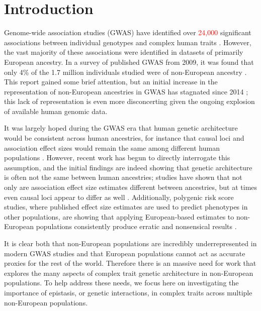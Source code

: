 \documentclass[12pt, a4paper]{article}
\begin{document}
\linenumbers

\section{Introduction}\label{InterPath-Introduction}

Genome-wide association studies (GWAS) have identified over \textcolor{red}{24,000} significant associations between individual genotypes and complex human traits \citep{Buniello2019}. However, the vast majority of these associations were identified in datasets of primarily European ancestry. In a survey of published GWAS from 2009, it was found that only 4\% of the 1.7 million individuals studied were of non-European ancestry \citep{Need2009}. This report gained some brief attention, but an initial increase in the representation of non-European ancestries in GWAS has stagnated since 2014 \citep{Popejoy2016,Martin2019}; this lack of representation is even more disconcerting given the ongoing explosion of available human genomic data. 

It was largely hoped during the GWAS era that human genetic architecture would be consistent across human ancestries, for instance that causal loci and association effect sizes would remain the same among different human populations \citep{Need2009,Pulit2010,Bustamante2011,Bien2019}. However, recent work has begun to directly interrogate this assumption, and the initial findings are indeed showing that genetic architecture is often not the same between human ancestries; studies have shown that not only are association effect size estimates different between ancestries, but at times even causal loci appear to differ as well \citep{Dumitrescu2011,Carlson2013,Kuchenbaecker2019,Wojcik2019}. Additionally, polygenic risk score studies, where published effect size estimates are used to predict phenotypes in other populations, are showing that applying European-based estimates to non-European populations consistently produce erratic and nonsensical results \citep{Martin2017,Duncan2019,Kerminen2019,Rosenberg2019}.

It is clear both that non-European populations are incredibly underrepresented in modern GWAS studies and that European populations cannot act as accurate proxies for the rest of the world. Therefore there is an massive need for work that explores the many aspects of complex trait genetic architecture in non-European populations. To help address these needs, we focus here on investigating the importance of epistasis, or genetic interactions, in complex traits across multiple non-European populations. 
\end{document}
